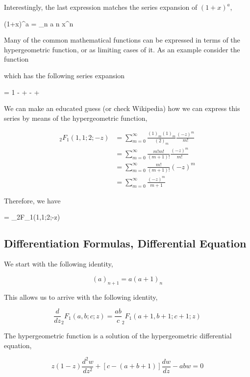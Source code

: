 Interestingly, the last expression matches the series expansion of $(1+x)^a$,

\bee
(1+x)^a = \sum_n {a \choose n} x^n
\eee

Many of the common mathematical functions can be expressed in terms of the hypergeometric function, or as limiting cases of it. As an example consider the function

\bee
{}
\eee

which has the following series expansion

\bee
{} = 1 -  +  -  +  \mp \cdots
\eee

We can make an educated guess (or check Wikipedia) how we can express this series by means of the hypergeometric function,

\begin{align*}
_2F_1(1,1;2;-z) &= \sum_{m=0}^\infty \frac{(1)_m (1)_m}{(2)_m} \frac{(-z)^m}{m!} \\
&= \sum_{m=0}^\infty \frac{m! m!}{(m+1)!} \frac{(-z)^m}{m!} \\
&= \sum_{m=0}^\infty \frac{m!}{(m+1)!} (-z)^m \\
&= \sum_{m=0}^\infty \frac{(-z)^m}{m+1}
\end{align*}

Therefore, we have

\bee
{} = _2F_1(1,1;2;-z)
\eee

\subsection{Differentiation Formulas, Differential Equation}

We start with the following identity,

\begin{equation*}
    (a)_{n+1} = a (a+1)_n
\end{equation*}

This allows us to arrive with the following identity,

\begin{equation*}
    \frac{d}{dz} _2 F_1(a,b;c;z) = \frac{ab}{c} _2 F_1(a+1,b+1;c+1;z)
\end{equation*}

The hypergeometric function is a solution of the hypergeometric differential equation,

\begin{equation*}
    z(1-z) \frac{d^2 w}{dz^2} + \left[c - (a+b+1)\right] \frac{dw}{dz} - abw = 0
\end{equation*}




